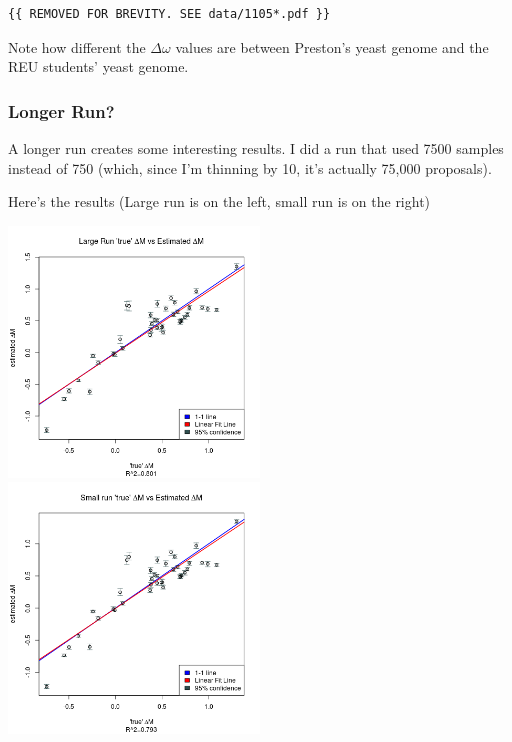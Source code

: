 \begin{verbatim}
{{ REMOVED FOR BREVITY. SEE data/1105*.pdf }}
\end{verbatim}


Note how different the $\Delta\omega$ values are between Preston's yeast genome and the REU students' yeast genome.



\subsubsection{Longer Run?}

A longer run creates some interesting results. I did a run that used 7500 samples instead of 750 (which, since I'm thinning by 10, it's actually 75,000 proposals).

Here's the results (Large run is on the left, small run is on the right)

\includegraphics[width=0.5\textwidth]{data/mu_largerun.png}
\includegraphics[width=0.5\textwidth]{data/mu_smallrun.png}

